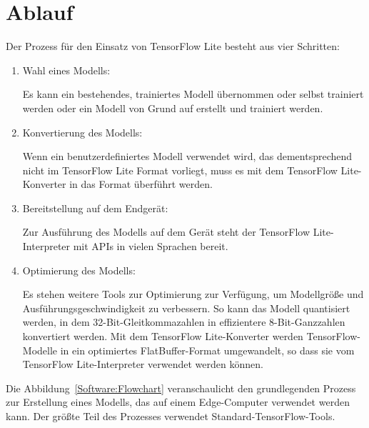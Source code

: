 \section{Ablauf}
 
Der Prozess für den Einsatz von TensorFlow Lite besteht aus vier Schritten:
 
\begin{enumerate}
  \item Wahl eines Modells:
 
      Es kann ein bestehendes, trainiertes Modell übernommen oder selbst trainiert werden oder ein Modell von Grund auf erstellt und trainiert werden.
  \item Konvertierung des Modells:

        Wenn ein benutzerdefiniertes Modell verwendet wird, das dementsprechend nicht im TensorFlow Lite Format vorliegt, muss es mit dem  TensorFlow Lite-Konverter in das Format überführt werden.
  \item Bereitstellung auf dem Endgerät:
  
        Zur Ausführung des Modells auf dem Gerät steht der TensorFlow Lite-Interpreter mit APIs in vielen Sprachen bereit.

 \item Optimierung des Modells:
 
       Es stehen weitere Tools zur Optimierung zur Verfügung, um Modellgröße und Ausführungsgeschwindigkeit zu verbessern. So kann das Modell quantisiert werden, in dem 32-Bit-Gleitkommazahlen in effizientere 8-Bit-Ganzzahlen konvertiert werden. Mit dem TensorFlow Lite-Konverter werden TensorFlow-Modelle in ein optimiertes FlatBuffer-Format umgewandelt, so dass sie vom TensorFlow Lite-Interpreter verwendet werden können. \cite{GoogleTensorFlowLite:2021}       
\end{enumerate}


Die Abbildung~\ref{Software:Flowchart} veranschaulicht den grundlegenden Prozess zur Erstellung eines Modells, das auf einem Edge-Computer verwendet werden kann. Der größte Teil des Prozesses verwendet Standard-TensorFlow-Tools. 

